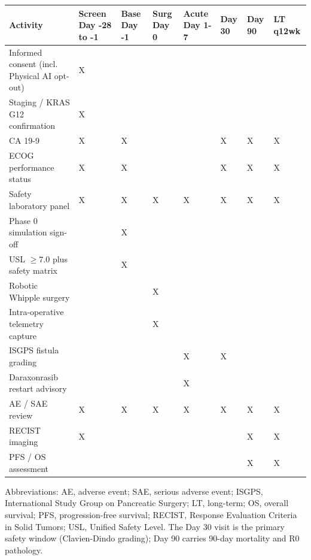 \vspace{0.3em}

\noindent\begin{tabularx}{\textwidth}{L{4.2cm} C{1.85cm} C{1.25cm} C{1.15cm} C{1.55cm} C{1.0cm} C{1.0cm} C{1.45cm}}
\toprule
\textbf{Activity} & \textbf{Screen Day -28 to -1} & \textbf{Base Day -1} & \textbf{Surg Day 0} & \textbf{Acute Day 1-7} & \textbf{Day 30} & \textbf{Day 90} & \textbf{LT q12wk} \\
\midrule
Informed consent (incl. Physical AI opt-out) & X & & & & & & \\
Staging / KRAS G12 confirmation & X & & & & & & \\
CA 19-9 & X & X & & & X & X & X \\
ECOG performance status & X & X & & & X & X & X \\
Safety laboratory panel & X & X & X & X & X & X & X \\
Phase 0 simulation sign-off & & X & & & & & \\
USL $\geq 7.0$ plus safety matrix & & X & & & & & \\
Robotic Whipple surgery & & & X & & & & \\
Intra-operative telemetry capture & & & X & & & & \\
ISGPS fistula grading & & & & X & X & & \\
Daraxonrasib restart advisory & & & & X & & & \\
AE / SAE review & X & X & X & X & X & X & X \\
RECIST imaging & X & & & & & X & X \\
PFS / OS assessment & & & & & & X & X \\
\bottomrule
\end{tabularx}

\vspace{0.3em}

\noindent Abbreviations: AE, adverse event; SAE, serious adverse event; ISGPS,
International Study Group on Pancreatic Surgery; LT, long-term; OS, overall
survival; PFS, progression-free survival; RECIST, Response Evaluation Criteria in
Solid Tumors; USL, Unified Safety Level. The Day 30 visit is the primary safety
window (Clavien-Dindo grading); Day 90 carries 90-day mortality and R0 pathology.
